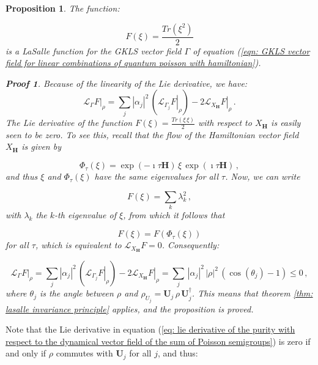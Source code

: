 \documentclass[11pt]{article}
\newcommand{\be}{\begin{equation}}
\newcommand{\ee}{\end{equation}}
\newtheorem{prop}{Proposition}
\newtheorem*{pf}{Proof}
\begin{document}
\begin{prop}\label{prop: purity is a lasalle function for linear combinations of quantum poisson semigroups with hamiltonian}
The function:

\be
F(\xi)=\frac{Tr\left(\xi^{2}\right)}{2}
\ee
is a LaSalle function for the GKLS vector field $\Gamma$ of equation (\ref{eqn: GKLS vector field for linear combinations of quantum poisson with hamiltonian}).

\begin{pf}
Because of the linearity of the Lie derivative, we have:
\be
\left.\mathcal{L}_{\Gamma}F\right|_{\rho}=\sum_{j} |\alpha_{j}|^{2}\, \left( \left.\mathcal{L}_{\Gamma_{j}}F\right|_{\rho}\right) -2 \left.\mathcal{L}_{X_{\mathbf{H}}}F\right|_{\rho}\,.
\ee
The Lie derivative of the function $F(\xi)=\frac{Tr(\xi\,\xi)}{2}$ with respect to $X_{\mathbf{H}}$ is easily seen to be zero.
To see this, recall that the flow of the Hamiltonian vector field $X_{\mathbf{H}}$ is given by 

\be
\Phi_{\tau}(\xi)=\exp(-\imath \tau\mathbf{H})\,\xi\,\exp(\imath \tau \mathbf{H})\,,
\ee
and thus $\xi$ and $\Phi_{\tau}(\xi)$ have the same eigenvalues for all $\tau$.
Now, we can write 

$$
F(\xi)=\sum_{k}\lambda^{2}_{k}\,,
$$
with $\lambda_{k}$ the $k$-th eigenvalue of $\xi$, from which it follows that 

$$
F(\xi)=F(\Phi_{\tau}(\xi))
$$
for all $\tau$, which is equivalent to $\mathcal{L}_{X_{\mathbf{H}}}F=0$.
Consequently:

\be\label{eq: lie derivative of the purity with respect to the dynamical vector field of the sum of Poisson semigroups}
\left.\mathcal{L}_{\Gamma}F\right|_{\rho}=\sum_{j} |\alpha_{j}|^{2}\, \left( \left.\mathcal{L}_{\Gamma_{j}}F\right|_{\rho}\right) -2 \left.\mathcal{L}_{X_{\mathbf{H}}}F\right|_{\rho}=\sum_{j}\,|\alpha_{j}|^{2}\,|\rho|^{2}\,\left(\cos(\theta_{j}) - 1\right)\leq 0\,,
\ee
where $\theta_{j}$ is the angle between $\rho$ and $\rho_{U_{j}}=\mathbf{U}_{j}\,\rho\,\mathbf{U}_{j}^{\dagger}$.
This means that theorem \ref{thm: lasalle invariance principle} applies, and the proposition is proved.
\end{pf}
\end{prop}


Note that the Lie derivative in equation (\ref{eq: lie derivative of the purity with respect to the dynamical vector field of the sum of Poisson semigroups}) is  zero if and only if $\rho$  commutes with $\mathbf{U}_{j}$ for all $j$, and thus:
\end{document}
